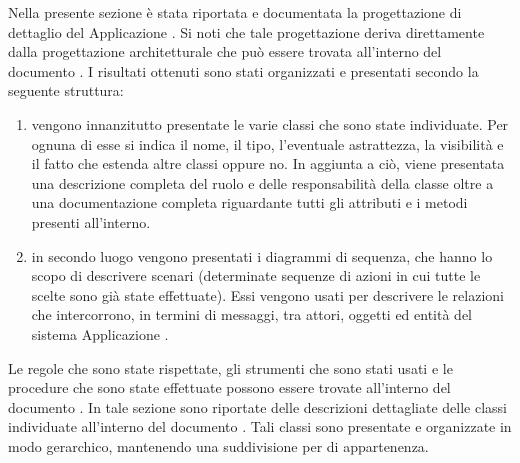    Nella presente sezione è stata riportata e documentata la progettazione di dettaglio del  Applicazione . Si noti che tale progettazione deriva direttamente dalla progettazione architetturale che può essere trovata all'interno del documento . I risultati ottenuti sono stati organizzati e presentati secondo la seguente struttura:
    \begin{enumerate}
        \item vengono innanzitutto presentate le varie classi che sono state individuate. Per ognuna di esse si indica il nome, il tipo, l'eventuale astrattezza, la visibilità e il fatto che estenda altre classi oppure no. In aggiunta a ciò, viene presentata una descrizione completa del ruolo e delle responsabilità della classe oltre a una documentazione completa riguardante tutti gli attributi e i metodi presenti all'interno.
        \item in secondo luogo vengono presentati i diagrammi di sequenza, che hanno lo scopo di descrivere scenari (determinate sequenze di azioni in cui tutte le scelte sono già state effettuate). Essi vengono usati per descrivere le relazioni che intercorrono, in termini di messaggi, tra attori, oggetti ed entità del sistema Applicazione .
    \end{enumerate}
    Le regole che sono state rispettate, gli strumenti che sono stati usati e le procedure che sono state effettuate possono essere trovate all'interno del documento .
        In tale sezione sono riportate delle descrizioni dettagliate delle classi individuate all'interno del documento . Tali classi sono presentate e organizzate in modo gerarchico, mantenendo una suddivisione per  di appartenenza.
        

        

